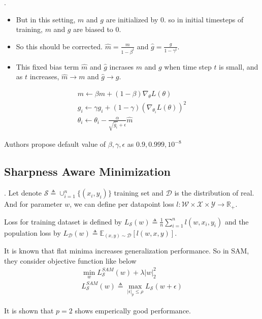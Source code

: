 \documentclass[8pt]{beamer}
\newcommand{\mbb}[1]{\mathbb{#1}}
\newcommand{\mc}[1]{\mathcal{#1}}
\newcommand{\abs}[1]{\left\lvert #1 \right\rvert}
\begin{document}
\begin{frame}{.}
    \begin{itemize}
        \item But in this setting, $m$ and $g$ are initialized by $0$. so in initial timesteps of training, $m$ and $g$ are biased to $0$.
        \item So this should be corrected. $\hat{m} = \frac{m}{1 - \beta^t}$ and $\hat{g} = \frac{g}{1 - \gamma^t}$.
        \item This fixed bias term $\hat{m}$ and $\hat{g}$ incrases $m$ and $g$ when time step $t$ is small, and as $t$ increases, $\hat{m} \rightarrow m$ and $\hat{g} \rightarrow g$.
    \end{itemize}

    \[
        \begin{gathered}
        m \leftarrow \beta m + (1- \beta) \nabla_{\theta} L(\theta) \\
        g_i \leftarrow \gamma g_i  + (1- \gamma) (\nabla_{\theta_i} L(\theta))^2\\
        \theta_i \leftarrow \theta_i - \frac{\alpha}{\sqrt{\hat{g}_i} + \epsilon}\hat{m}
    \end{gathered}
    \]

    Authors propose default value of $\beta, \gamma, \epsilon$ as $0.9, 0.999, 10^{-8}$
\end{frame}

\subsection{Sharpness Aware Minimization}
\begin{frame}{.}
    Let denote $\mc{S} \triangleq \cup_{i=1}^n \{(x_i, y_i)\}$ training set and  $\mc{D}$ is the distribution of real. 
    And for parameter $w$, we can define per datapoint loss $l: \mc{W} \times \mc{X} \times \mc{Y}\to \mbb{R}_{+}$. 

    Loss for training dataset is defined by $L_\mc{S}(w) \triangleq \frac{1}{n} \sum_{i=1}^n l(w, x_i, y_i) $ and the population loss by $L_\mc{D}(w) \triangleq \mbb{E}_{(x,y) \sim \mc{D}}[ l(w, x, y) ]$.

    It is known that flat minima increases generalization performance. So in SAM, they consider objective function like below
    \[
        \begin{gathered}
            \min_{w} L^{SAM}_{\mc{S}}(w) + \lambda \abs{w}^2_2 \\
            L^{SAM}_{\mc{S}}(w) \triangleq \max_{\abs{\epsilon}_p \leq \rho } L_{\mc{S}}(w+ \epsilon)
        \end{gathered}
    \]

    It is shown that $p=2$ shows emperically good performance.

\end{frame}
\end{document}
